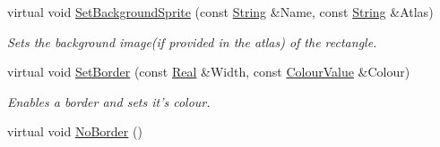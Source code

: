 \begin{DoxyCompactItemize}
virtual void \hyperlink{classphys_1_1UI_1_1Rectangle_aa20172e511e24ed24e21e0bdac0e00c4}{SetBackgroundSprite} (const \hyperlink{namespacephys_aa03900411993de7fbfec4789bc1d392e}{String} \&Name, const \hyperlink{namespacephys_aa03900411993de7fbfec4789bc1d392e}{String} \&Atlas)
\begin{DoxyCompactList}\small\item\em Sets the background image(if provided in the atlas) of the rectangle. \item\end{DoxyCompactList}\item 
virtual void \hyperlink{classphys_1_1UI_1_1Rectangle_aaea6f9d5cd62b63a132c03c894a6d8de}{SetBorder} (const \hyperlink{namespacephys_af7eb897198d265b8e868f45240230d5f}{Real} \&Width, const \hyperlink{classphys_1_1ColourValue}{ColourValue} \&Colour)
\begin{DoxyCompactList}\small\item\em Enables a border and sets it's colour. \item\end{DoxyCompactList}\item 
\hypertarget{classphys_1_1UI_1_1Rectangle_aebeea2052a72be49eb9dece731022c78}{
virtual void \hyperlink{classphys_1_1UI_1_1Rectangle_aebeea2052a72be49eb9dece731022c78}{NoBorder} ()}
\label{classphys_1_1UI_1_1Rectangle_aebeea2052a72be49eb9dece731022c78}


\end{DoxyCompactItemize}

